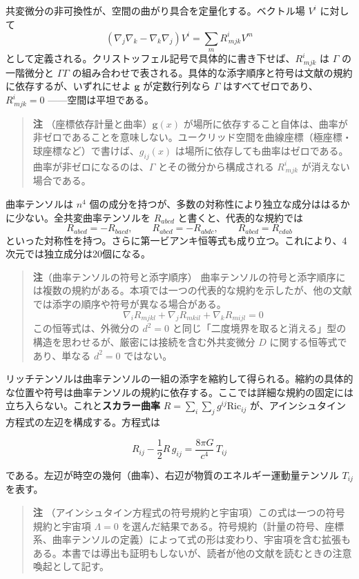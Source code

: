 \documentclass[a4paper,12pt,openany]{book}
\begin{document}
共変微分の非可換性が、空間の曲がり具合を定量化する。ベクトル場 \(V^i\)
に対して
\[(\nabla_j \nabla_k - \nabla_k \nabla_j) V^i = \sum_m R^i_{\,mjk} V^m\]
として定義される。クリストッフェル記号で具体的に書き下せば、\(R^i_{\,mjk}\)
は \(\Gamma\) の一階微分と \(\Gamma\Gamma\)
の組み合わせで表される。具体的な添字順序と符号は文献の規約に依存するが、いずれにせよ
\(\mathbf{g}\) が定数行列なら \(\Gamma\)
はすべてゼロであり、\(R^i_{\,mjk} = 0\) ——空間は平坦である。

\begin{quote}
\textbf{注} （座標依存計量と曲率）\(\mathbf{g}(x)\)
が場所に依存すること自体は、曲率が非ゼロであることを意味しない。ユークリッド空間を曲線座標（極座標・球座標など）で書けば、\(g_{ij}(x)\)
は場所に依存しても曲率はゼロである。曲率が非ゼロになるのは、\(\Gamma\)
とその微分から構成される \(R^i_{\,mjk}\) が消えない場合である。
\end{quote}

曲率テンソルは \(n^4\)
個の成分を持つが、多数の対称性により独立な成分ははるかに少ない。全共変曲率テンソルを
\(R_{abcd}\) と書くと、代表的な規約では
\[R_{abcd}=-R_{bacd},\qquad R_{abcd}=-R_{abdc},\qquad R_{abcd}=R_{cdab}\]
といった対称性を持つ。さらに第一ビアンキ恒等式も成り立つ。これにより、4次元では独立成分は20個になる。

\begin{quote}
\textbf{注}（曲率テンソルの符号と添字順序）
曲率テンソルの符号と添字順序には複数の規約がある。本項では一つの代表的な規約を示したが、他の文献では添字の順序や符号が異なる場合がある。
\[
\nabla_i R_{mjkl}+\nabla_j R_{mkil}+\nabla_k R_{mijl}=0
\] この恒等式は、外微分の \(d^2=0\)
と同じ「二度境界を取ると消える」型の構造を思わせるが、厳密には接続を含む外共変微分
\(D\) に関する恒等式であり、単なる \(d^2=0\) ではない。
\end{quote}

リッチテンソルは曲率テンソルの一組の添字を縮約して得られる。縮約の具体的な位置や符号は曲率テンソルの規約に依存する。ここでは詳細な規約の固定には立ち入らない。これと\textbf{スカラー曲率}
\(R = \sum_i\sum_j g^{ij} \mathrm{Ric}_{ij}\)
が、アインシュタイン方程式の左辺を構成する。方程式は

\[R_{ij} - \frac{1}{2}R\,g_{ij} = \frac{8\pi G}{c^4}\,T_{ij}\]

である。左辺が時空の幾何（曲率）、右辺が物質のエネルギー運動量テンソル
\(T_{ij}\) を表す。

\begin{quote}
\textbf{注}
（アインシュタイン方程式の符号規約と宇宙項）この式は一つの符号規約と宇宙項
\(\Lambda = 0\)
を選んだ結果である。符号規約（計量の符号、座標系、曲率テンソルの定義）によって式の形は変わり、宇宙項を含む拡張もある。本書では導出も証明もしないが、読者が他の文献を読むときの注意喚起として記す。
\end{quote}
\end{document}
